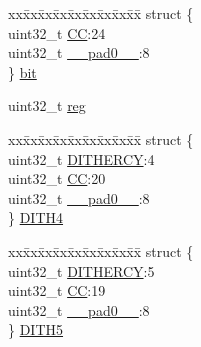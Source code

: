 \begin{DoxyCompactItemize}
\begin{tabbing}
\end{tabbing}\item 
\begin{tabbing}
xx\=xx\=xx\=xx\=xx\=xx\=xx\=xx\=xx\=\kill
struct \{\\
\>uint32\_t \mbox{\hyperlink{union_t_c_c___c_c___type_a10f2b0518af5a37e14c710d230272d1d}{CC}}:24\\
\>uint32\_t \mbox{\hyperlink{union_t_c_c___c_c___type_a3e57c2ef1c3ffb36722f000cc1156824}{\_\_pad0\_\_}}:8\\
\} \mbox{\hyperlink{union_t_c_c___c_c___type_aab9c20a1a6d1b1582ba9b26a9367a4f7}{bit}}\\

\end{tabbing}\item 
uint32\+\_\+t \mbox{\hyperlink{union_t_c_c___c_c___type_a6b91636401516a477989a336376d7b40}{reg}}
\item 
\begin{tabbing}
xx\=xx\=xx\=xx\=xx\=xx\=xx\=xx\=xx\=\kill
struct \{\\
\>uint32\_t \mbox{\hyperlink{union_t_c_c___c_c___type_a1e7fc84641e39de898f29ee9268f22aa}{DITHERCY}}:4\\
\>uint32\_t \mbox{\hyperlink{union_t_c_c___c_c___type_a10f2b0518af5a37e14c710d230272d1d}{CC}}:20\\
\>uint32\_t \mbox{\hyperlink{union_t_c_c___c_c___type_a3e57c2ef1c3ffb36722f000cc1156824}{\_\_pad0\_\_}}:8\\
\} \mbox{\hyperlink{union_t_c_c___c_c___type_a7b1ef160b7724ed6570191a16b6206e4}{DITH4}}\\

\end{tabbing}\item 
\begin{tabbing}
xx\=xx\=xx\=xx\=xx\=xx\=xx\=xx\=xx\=\kill
struct \{\\
\>uint32\_t \mbox{\hyperlink{union_t_c_c___c_c___type_a1e7fc84641e39de898f29ee9268f22aa}{DITHERCY}}:5\\
\>uint32\_t \mbox{\hyperlink{union_t_c_c___c_c___type_a10f2b0518af5a37e14c710d230272d1d}{CC}}:19\\
\>uint32\_t \mbox{\hyperlink{union_t_c_c___c_c___type_a3e57c2ef1c3ffb36722f000cc1156824}{\_\_pad0\_\_}}:8\\
\} \mbox{\hyperlink{union_t_c_c___c_c___type_a558e8e9ea81793b987c3038089537f46}{DITH5}}\\


\end{tabbing}
\end{DoxyCompactItemize}
